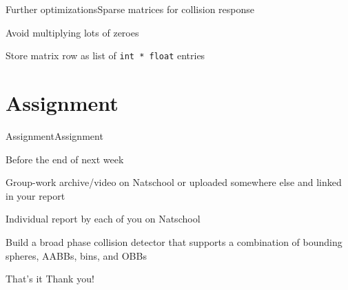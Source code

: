 \documentclass{beamer}
\begin{document}
\begin{slide}{Further optimizations}{Sparse matrices for collision response}{
\item Avoid multiplying lots of zeroes
\item Store matrix row as list of \texttt{int * float} entries
}\end{slide}

\section{Assignment}
\begin{slide}{Assignment}{Assignment}{
\item Before the end of next week
\item Group-work archive/video on Natschool or uploaded somewhere else and linked in your report
\item Individual report by each of you on Natschool
\item Build a broad phase collision detector that supports a combination of bounding spheres, AABBs, bins, and OBBs
}\end{slide}

\begin{frame}{That's it}
\center
\fontsize{18pt}{7.2}\selectfont
Thank you!
\end{frame}
\end{document}
